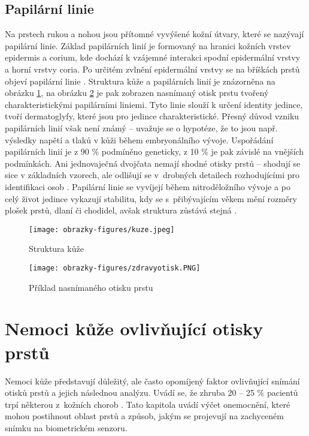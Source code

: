 \subsection{Papilární linie}
Na prstech rukou a nohou jsou přítomné vyvýšené kožní útvary, které se nazývají papilární linie. Základ papilárních linií je formovaný na hranici kožních vrstev epidermis a corium, kde dochází k vzájemné interakci spodní epidermální vrstvy a horní vrstvy coria. Po určitém zvlnění epidermální vrstvy se na bříškách prstů objeví papilární linie \cite{DermatologickeFaktory}. Struktura kůže a papilárních linií je znázorněna na obrázku \ref{fig:kuze}, na obrázku \ref{fig:zdravyotisk} je pak zobrazen nasnímaný otisk prstu tvořený charakteristickými papilárními liniemi. Tyto linie slouží k určení identity jedince, tvoří dermatoglyfy, které jsou pro jedince charakteristické. Přesný důvod vzniku papilárních linií však není známý -- uvažuje se o hypotéze, že to jsou např. výsledky napětí a tlaků v kůži během embryonálního vývoje. Uspořádání papilárních linií je z 90 \% podmíněno geneticky, z 10 \% je pak závislé na vnějších podmínkách. Ani jednovaječná dvojčata nemají shodné otisky prstů -- shodují se sice v základních vzorech, ale odlišují se v~drobných detailech rozhodujícími pro identifikaci osob \cite{Dermatoglyfika}. Papilární linie se vyvíjejí během nitroděložního vývoje a po celý život jedince vykazují stabilitu, kdy se s~přibývajícím věkem mění rozměry plošek prstů, dlaní či chodidel, avšak struktura zůstává stejná \cite{DermatologickeFaktory}. \\

\begin{figure}[!htbp]
    \centering
    \texttt{[image: obrazky-figures/kuze.jpeg]}
    \caption{Struktura kůže \cite{DermatologickeFaktory}}
    \label{fig:kuze}
\end{figure}

\begin{figure}[!htbp]
    \centering
    \texttt{[image: obrazky-figures/zdravyotisk.PNG]}
    \caption{Příklad nasnímaného otisku prstu \cite{BIOotiskyLecture}}
    \label{fig:zdravyotisk}
\end{figure}

\section{Nemoci kůže ovlivňující otisky prstů}
\label{sec:nemoci}
Nemoci kůže představují důležitý, ale často opomíjený faktor ovlivňující snímání otisků prstů a jejich následnou analýzu. Uvádí se, že zhruba 20 -- 25 \% pacientů trpí některou z~kožních chorob \cite{InfluenceSkinDiseases}. Tato kapitola uvádí výčet onemocnění, které mohou postihnout oblast prstů a způsob, jakým se projevují na zachyceném snímku na biometrickém senzoru. 
